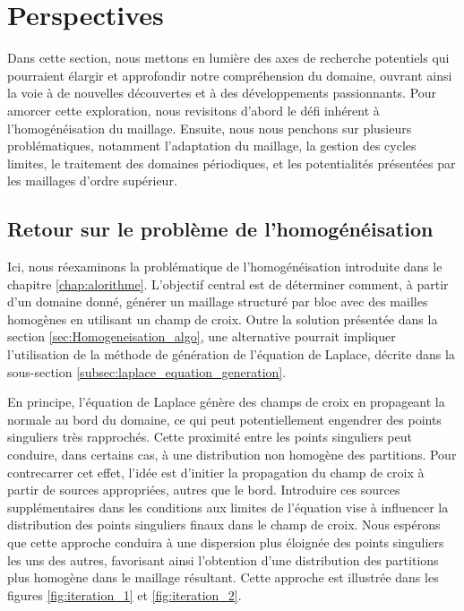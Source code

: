 \section{Perspectives}
\label{sec:perspectives}

Dans cette section, nous mettons en lumière des axes de recherche potentiels qui pourraient élargir et approfondir notre compréhension du domaine, ouvrant ainsi la voie à de nouvelles découvertes et à des développements passionnants. Pour amorcer cette exploration, nous revisitons d'abord le défi inhérent à l'homogénéisation du maillage. Ensuite, nous nous penchons sur plusieurs problématiques, notamment l'adaptation du maillage, la gestion des cycles limites, le traitement des domaines périodiques, et les potentialités présentées par les maillages d'ordre supérieur.

\subsection*{Retour sur le problème de l'homogénéisation}

Ici, nous réexaminons la problématique de l'homogénéisation introduite dans le chapitre \ref{chap:alorithme}. L'objectif central est de déterminer comment, à partir d'un domaine donné, générer un maillage structuré par bloc avec des mailles homogènes en utilisant un champ de croix. Outre la solution présentée dans la section \ref{sec:Homogeneisation_algo}, une alternative pourrait impliquer l'utilisation de la méthode de génération de l'équation de Laplace, décrite dans la sous-section \ref{subsec:laplace_equation_generation}.

En principe, l'équation de Laplace génère des champs de croix en propageant la normale au bord du domaine, ce qui peut potentiellement engendrer des points singuliers très rapprochés. Cette proximité entre les points singuliers peut conduire, dans certains cas, à une distribution non homogène des partitions. Pour contrecarrer cet effet, l'idée est d'initier la propagation du champ de croix à partir de sources appropriées, autres que le bord. Introduire ces sources supplémentaires dans les conditions aux limites de l'équation vise à influencer la distribution des points singuliers finaux dans le champ de croix. Nous espérons que cette approche conduira à une dispersion plus éloignée des points singuliers les uns des autres, favorisant ainsi l'obtention d'une distribution des partitions plus homogène dans le maillage résultant. Cette approche est illustrée dans les figures \ref{fig:iteration_1} et \ref{fig:iteration_2}.

